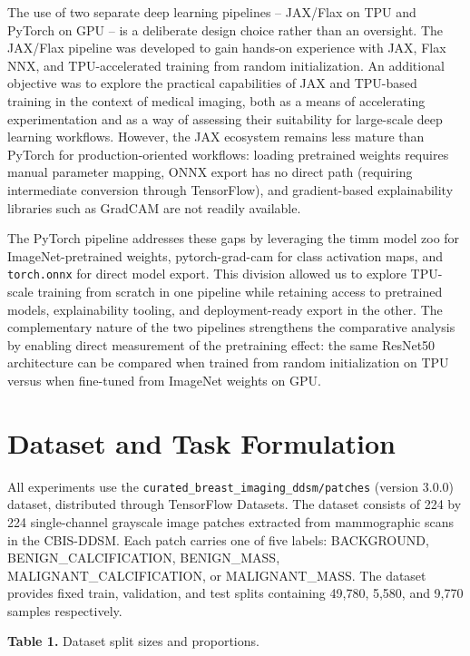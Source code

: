 \documentclass[justified,notoc,openany]{tufte-book}
\begin{document}
The use of two separate deep learning pipelines -- JAX/Flax on TPU and PyTorch on GPU -- is a deliberate design choice rather than an oversight. The JAX/Flax pipeline was developed to gain hands-on experience with JAX, Flax NNX, and TPU-accelerated training from random initialization. An additional objective was to explore the practical capabilities of JAX and TPU-based training in the context of medical imaging, both as a means of accelerating experimentation and as a way of assessing their suitability for large-scale deep learning workflows. However, the JAX ecosystem remains less mature than PyTorch for production-oriented workflows: loading pretrained weights requires manual parameter mapping, ONNX export has no direct path (requiring intermediate conversion through TensorFlow), and gradient-based explainability libraries such as GradCAM are not readily available.

The PyTorch pipeline addresses these gaps by leveraging the timm model zoo for ImageNet-pretrained weights, pytorch-grad-cam for class activation maps, and \texttt{torch.onnx} for direct model export. This division allowed us to explore TPU-scale training from scratch in one pipeline while retaining access to pretrained models, explainability tooling, and deployment-ready export in the other. The complementary nature of the two pipelines strengthens the comparative analysis by enabling direct measurement of the pretraining effect: the same ResNet50 architecture can be compared when trained from random initialization on TPU versus when fine-tuned from ImageNet weights on GPU.

\section{Dataset and Task Formulation}\label{dataset-and-task-formulation}

All experiments use the \texttt{curated\_breast\_imaging\_ddsm/patches} (version 3.0.0) dataset, distributed through TensorFlow Datasets. The dataset consists of 224 by 224 single-channel grayscale image patches extracted from mammographic scans in the CBIS-DDSM. Each patch carries one of five labels: BACKGROUND, BENIGN\_CALCIFICATION, BENIGN\_MASS, MALIGNANT\_CALCIFICATION, or MALIGNANT\_MASS. The dataset provides fixed train, validation, and test splits containing 49,780, 5,580, and 9,770 samples respectively.

\textbf{Table 1.} Dataset split sizes and proportions.
\end{document}
